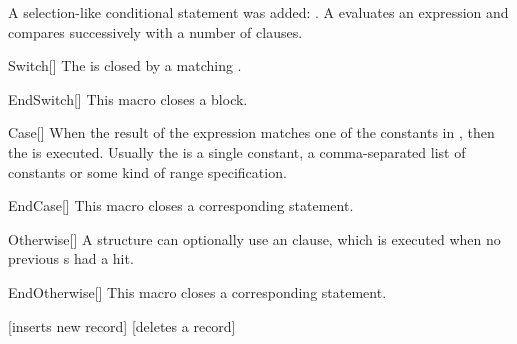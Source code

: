 \documentclass[a4paper, 11pt]{article}
\begin{document}
A selection-like conditional statement was added: . A  evaluates an expression and compares successively with a number of  clauses.

\begin{macro}{Switch}[]
    The  is closed by a matching .

    \BlockOptions
\end{macro}

\begin{macro}{EndSwitch}[]
    This macro closes a  block.

    \StatementOptions
\end{macro}

\begin{macro}{Case}[]
    When the result of the  expression matches one of the constants in , then the  is executed. Usually the  is a single constant, a comma-separated list of constants or some kind of range specification.

    \BlockOptions
\end{macro}

\begin{macro}{EndCase}[]
    This macro closes a corresponding  statement.

    \StatementOptions
\end{macro}

\begin{macro}{Otherwise}[]
    A  structure can optionally use an  clause, which is executed when no previous s had a hit.

    \BlockOptions
\end{macro}

\begin{macro}{EndOtherwise}[]
    This macro closes a corresponding  statement.

    \StatementOptions
\end{macro}

\begin{tcblisting}{}
    \begin{algorithmic}
            [inserts new record]
            \EndCase
            [deletes a record]
            \EndCase
            \Otherwise
            \EndOtherwise
        \EndSwitch
    \end{algorithmic}
\end{tcblisting}
\end{document}
